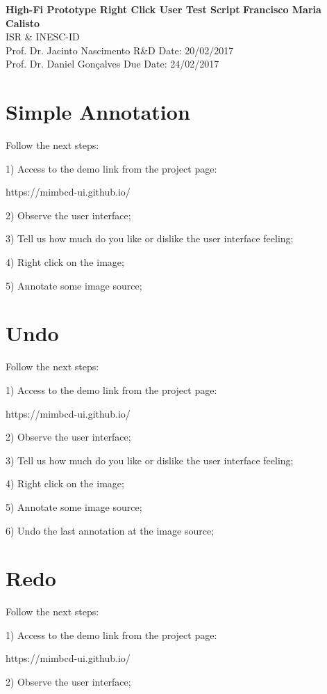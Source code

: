 \documentclass[a4paper, 11pt]{article}
\begin{document}
\noindent
\large\textbf{High-Fi Prototype Right Click User Test Script} \hfill \textbf{Francisco Maria Calisto} \\
\normalsize ISR \& INESC-ID \\
Prof. Dr. Jacinto Nascimento \hfill R\&D Date: 20/02/2017 \\
Prof. Dr. Daniel Gon\c{c}alves \hfill Due Date: 24/02/2017

\section*{Simple Annotation}

Follow the next steps:

1) Access to the demo link from the project page:

https://mimbcd-ui.github.io/

2) Observe the user interface;

3) Tell us how much do you like or dislike the user interface feeling;

4) Right click on the image;

5) Annotate some image source;

\section*{Undo}

Follow the next steps:

1) Access to the demo link from the project page:

https://mimbcd-ui.github.io/

2) Observe the user interface;

3) Tell us how much do you like or dislike the user interface feeling;

4) Right click on the image;

5) Annotate some image source;

6) Undo the last annotation at the image source;

\section*{Redo}

Follow the next steps:

1) Access to the demo link from the project page:

https://mimbcd-ui.github.io/

2) Observe the user interface;
\end{document}
